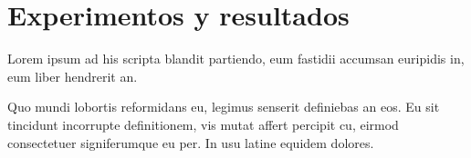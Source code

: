 \chapter[Experimentos y resultados]{Experimentos y resultados}\label{ch:capitulo4}
\fpar

\parindent=0pt Lorem ipsum ad his scripta blandit partiendo, eum fastidii accumsan euripidis in, eum liber hendrerit an. 

\vspace{0.5cm}
\parindent=30pt Quo mundi lobortis reformidans eu, legimus senserit definiebas an eos. Eu sit tincidunt incorrupte definitionem, vis mutat affert percipit cu, eirmod consectetuer signiferumque eu per. In usu latine equidem dolores.